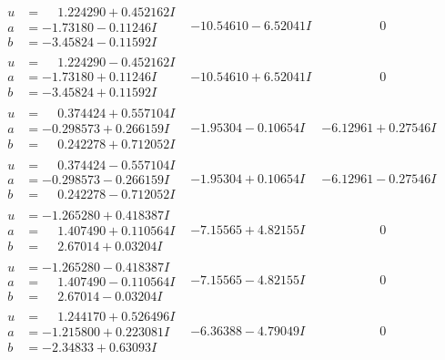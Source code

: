 \documentclass[1p]{elsarticle_modified}
\theoremstyle{definition}
\begin{document}
$$\begin{array}{c|c|c}
\begin{aligned}
u &= \phantom{-}1.224290 + 0.452162 I \\
a &= -1.73180 - 0.11246 I \\
b &= -3.45824 - 0.11592 I\end{aligned}
 & -10.54610 - 6.52041 I & \phantom{-0.000000 } 0 \\ \hline\begin{aligned}
u &= \phantom{-}1.224290 - 0.452162 I \\
a &= -1.73180 + 0.11246 I \\
b &= -3.45824 + 0.11592 I\end{aligned}
 & -10.54610 + 6.52041 I & \phantom{-0.000000 } 0 \\ \hline\begin{aligned}
u &= \phantom{-}0.374424 + 0.557104 I \\
a &= -0.298573 + 0.266159 I \\
b &= \phantom{-}0.242278 + 0.712052 I\end{aligned}
 & -1.95304 - 0.10654 I & -6.12961 + 0.27546 I \\ \hline\begin{aligned}
u &= \phantom{-}0.374424 - 0.557104 I \\
a &= -0.298573 - 0.266159 I \\
b &= \phantom{-}0.242278 - 0.712052 I\end{aligned}
 & -1.95304 + 0.10654 I & -6.12961 - 0.27546 I \\ \hline\begin{aligned}
u &= -1.265280 + 0.418387 I \\
a &= \phantom{-}1.407490 + 0.110564 I \\
b &= \phantom{-}2.67014 + 0.03204 I\end{aligned}
 & -7.15565 + 4.82155 I & \phantom{-0.000000 } 0 \\ \hline\begin{aligned}
u &= -1.265280 - 0.418387 I \\
a &= \phantom{-}1.407490 - 0.110564 I \\
b &= \phantom{-}2.67014 - 0.03204 I\end{aligned}
 & -7.15565 - 4.82155 I & \phantom{-0.000000 } 0 \\ \hline\begin{aligned}
u &= \phantom{-}1.244170 + 0.526496 I \\
a &= -1.215800 + 0.223081 I \\
b &= -2.34833 + 0.63093 I\end{aligned}
 & -6.36388 - 4.79049 I & \phantom{-0.000000 } 0 \\ \hline\begin{aligned}

\end{aligned}
\end{array}$$
\end{document}
